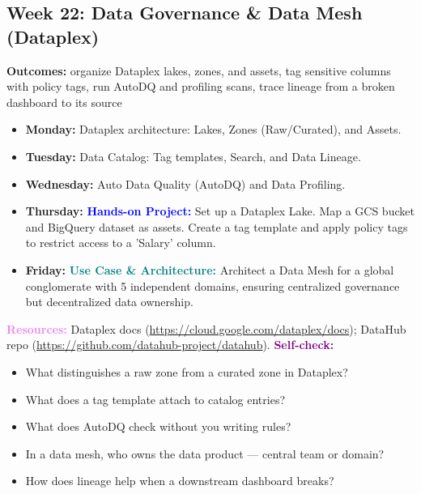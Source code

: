 \documentclass[11pt, a4paper]{article}
\newcommand{\project}[1]{\vspace{1mm}\noindent\textbf{\textcolor{blue}{Hands-on Project:}} #1}
\newcommand{\usecase}[1]{\vspace{1mm}\noindent\textbf{\textcolor{teal}{Use Case \& Architecture:}} #1}
\newcommand{\dayitem}[2]{\item \textbf{#1:} #2}
\newcommand{\resources}[1]{\vspace{1mm}\noindent\textbf{\textcolor{violet}{Resources:}} #1}
\newcommand{\selfcheck}[1]{\vspace{1mm}\noindent\textbf{\textcolor{purple}{Self-check:}} #1}
\begin{document}
\subsection*{Week 22: Data Governance \& Data Mesh (Dataplex)}
\par\noindent\textbf{Outcomes:} organize Dataplex lakes, zones, and assets, tag sensitive columns with policy tags, run AutoDQ and profiling scans, trace lineage from a broken dashboard to its source
\begin{itemize}[label=-]
    \dayitem{Monday}{Dataplex architecture: Lakes, Zones (Raw/Curated), and Assets.}
    \dayitem{Tuesday}{Data Catalog: Tag templates, Search, and Data Lineage.}
    \dayitem{Wednesday}{Auto Data Quality (AutoDQ) and Data Profiling.}
    \dayitem{Thursday}{\project{Set up a Dataplex Lake. Map a GCS bucket and BigQuery dataset as assets. Create a tag template and apply policy tags to restrict access to a 'Salary' column.}}
    \dayitem{Friday}{\usecase{Architect a Data Mesh for a global conglomerate with 5 independent domains, ensuring centralized governance but decentralized data ownership.}}
\end{itemize}
\resources{Dataplex docs (\url{https://cloud.google.com/dataplex/docs}); DataHub repo (\url{https://github.com/datahub-project/datahub}).}
\selfcheck{\begin{itemize}[label=-, nosep, leftmargin=1.5em]
    \item What distinguishes a raw zone from a curated zone in Dataplex?
    \item What does a tag template attach to catalog entries?
    \item What does AutoDQ check without you writing rules?
    \item In a data mesh, who owns the data product --- central team or domain?
    \item How does lineage help when a downstream dashboard breaks?
\end{itemize}}
\end{document}
